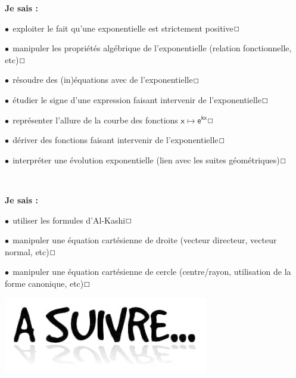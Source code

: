 \documentclass[a4paper,11pt]{article}
\begin{document}
\begin{casavoir}
\selectfont\small
\textbf{Je sais :}

\tabula{}$\bullet~~$exploiter le fait qu'une exponentielle est strictement positive\dotfill{}$\Large\Box$

\tabula{}$\bullet~~$manipuler les propriétés algébrique de l'exponentielle (relation fonctionnelle, etc)\dotfill{}$\Large\Box$

\tabula{}$\bullet~~$résoudre des (in)équations avec de l'exponentielle\dotfill{}$\Large\Box$

\tabula{}$\bullet~~$étudier le signe d'une expression faisant intervenir de l'exponentielle\dotfill{}$\Large\Box$

\tabula{}$\bullet~~$représenter l'allure de la courbe des fonctions $\mathsf{x \mapsto e^{kx}}$\dotfill{}$\Large\Box$

\tabula{}$\bullet~~$dériver des fonctions faisant intervenir de l'exponentielle\dotfill{}$\Large\Box$

\tabula{}$\bullet~~$interpréter une évolution exponentielle (lien avec les suites géométriques)\dotfill{}$\Large\Box$

\end{casavoir}

\color{titrebleu}\,\hrulefill

\begin{casavoir}
\selectfont\small
\textbf{Je sais :}

\tabula{}$\bullet~~$utiliser les formules d'Al-Kashi\dotfill{}$\Large\Box$

\tabula{}$\bullet~~$manipuler une équation cartésienne de droite (vecteur directeur, vecteur normal, etc)\dotfill{}$\Large\Box$

\tabula{}$\bullet~~$manipuler une équation cartésienne de cercle (centre/rayon, utilisation de la forme canonique, etc)\dotfill{}$\Large\Box$
\end{casavoir}

\vfill{}

\begin{center}
	\includegraphics[scale=1]{asuivre}
\end{center}
\end{document}

